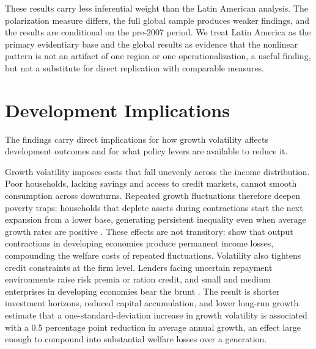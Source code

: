 \documentclass[12pt]{article}
\begin{document}
These results carry less inferential weight than the Latin American analysis.
The polarization measure differs, the full global sample produces weaker
findings, and the results are conditional on the pre-2007 period. We treat
Latin America as the primary evidentiary base and the global results as
evidence that the nonlinear pattern is not an artifact of one region or one
operationalization, a useful finding, but not a substitute for direct
replication with comparable measures.

\section{Development Implications}

The findings carry direct implications for how growth volatility affects
development outcomes and for what policy levers are available to reduce it.

Growth volatility imposes costs that fall unevenly across the income
distribution. Poor households, lacking savings and access to credit markets,
cannot smooth consumption across downturns. Repeated growth fluctuations
therefore deepen poverty traps: households that deplete assets during
contractions start the next expansion from a lower base, generating
persistent inequality even when average growth rates are positive
\citep{Loayza2007, HnatkovskaLoayza2005, MalikTemple2009}. These effects are not transitory:
\citet{CerraSaxena2008} show that output contractions in developing
economies produce permanent income losses, compounding the welfare costs
of repeated fluctuations. Volatility also tightens credit constraints at
the firm level. Lenders facing uncertain repayment environments raise risk
premia or ration credit, and small and medium enterprises in developing
economies bear the brunt \citep{Aminou2024}. The result is shorter investment horizons, reduced capital
accumulation, and lower long-run growth. \citet{Ramey1995} estimate that a
one-standard-deviation increase in growth volatility is associated with a
0.5 percentage point reduction in average annual growth, an effect large
enough to compound into substantial welfare losses over a generation.
\end{document}
